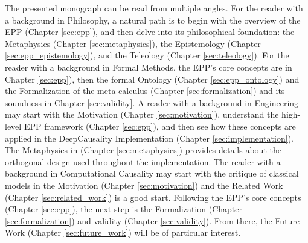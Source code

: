 The presented monograph can be read from multiple angles. For the reader with a background in Philosophy, a natural path is to begin with the overview of the EPP (Chapter \ref{sec:epp}), and then delve into its philosophical foundation: the Metaphysics (Chapter \ref{sec:metaphysics}), the Epistemology (Chapter \ref{sec:epp_epistemology}), and the Teleology (Chapter \ref{sec:teleology}).
For the reader with a background in Formal Methods, the EPP's core concepts are in Chapter \ref{sec:epp}), then the formal Ontology (Chapter \ref{sec:epp_ontology}) and the Formalization of the meta-calculus (Chapter \ref{sec:formalization}) and its soundness in Chapter \ref{sec:validity}.
A reader with a background in Engineering may start with the Motivation (Chapter \ref{sec:motivation}), understand the high-level EPP framework (Chapter  \ref{sec:epp}), and then see how these concepts are applied in the DeepCausality Implementation (Chapter \ref{sec:implementation}). The Metaphysics in (Chapter \ref{sec:metaphysics}) provides details about the orthogonal design used throughout the implementation.
The reader with a background in Computational Causality may start with the critique of classical models in the Motivation (Chapter \ref{sec:motivation}) and the Related Work (Chapter \ref{sec:related_work}) is a good start. Following the EPP's core concepts (Chapter \ref{sec:epp}), the next step is the Formalization (Chapter \ref{sec:formalization}) and validity (Chapter \ref{sec:validity}). From there, the Future Work (Chapter \ref{sec:future_work}) will be of particular interest.

\newpage
 